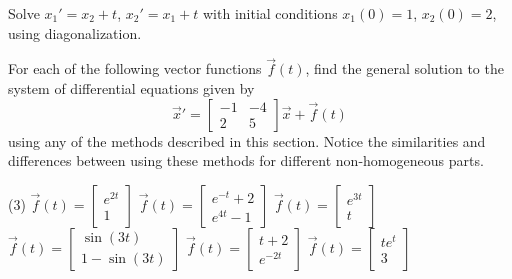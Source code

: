 \begin{exercise}\ansMark%
Solve
$x_1' = x_2 + t$, $x_2' = x_1 +t$ with initial conditions
$x_1(0) = 1$, $x_2(0) = 2$,
using diagonalization. %
\end{exercise}

\begin{exercise}
For each of the following vector functions $\vec{f}(t)$, find the general solution to the system of differential equations given by
\[ {\vec{x}}' = \begin{bmatrix} -1 & -4 \\ 2 & 5 \end{bmatrix} \vec{x} + \vec{f}(t)\] using any of the methods described in this section. Notice the similarities and differences between using these methods for different non-homogeneous parts.
\begin{tasks}(3)
\task $\vec{f}(t) = \begin{bmatrix} e^{2t} \\ 1 \end{bmatrix}$
\task $\vec{f}(t) = \begin{bmatrix} e^{-t} + 2 \\ e^{4t} - 1 \end{bmatrix}$
\task $\vec{f}(t) = \begin{bmatrix} e^{3t} \\ t \end{bmatrix}$
\task $\vec{f}(t) = \begin{bmatrix} \sin(3t) \\ 1 - \sin(3t) \end{bmatrix}$
\task $\vec{f}(t) = \begin{bmatrix} t + 2 \\ e^{-2t} \end{bmatrix}$
\task $\vec{f}(t) = \begin{bmatrix} te^{t} \\ 3 \end{bmatrix}$
\end{tasks} 
\end{exercise}

